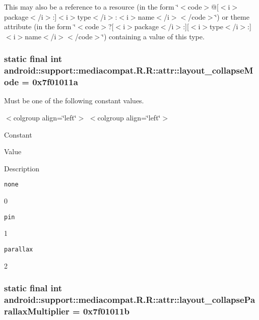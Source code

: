 This may also be a reference to a resource (in the form \char`\"{}$<$code$>$@\mbox{[}$<$i$>$package$<$/i$>$:\mbox{]}$<$i$>$type$<$/i$>$:$<$i$>$name$<$/i$>$$<$/code$>$\char`\"{}) or theme attribute (in the form \char`\"{}$<$code$>$?\mbox{[}$<$i$>$package$<$/i$>$:\mbox{]}\mbox{[}$<$i$>$type$<$/i$>$:\mbox{]}$<$i$>$name$<$/i$>$$<$/code$>$\char`\"{}) containing a value of this type. \hypertarget{classandroid_1_1support_1_1mediacompat_1_1_r_1_1attr_d38602f838c284d0b4e90f9d35408094}{
\subsubsection[{layout\_\-collapseMode}]{\setlength{\rightskip}{0pt plus 5cm}static final int android::support::mediacompat.R.R::attr::layout\_\-collapseMode = 0x7f01011a}}
\label{classandroid_1_1support_1_1mediacompat_1_1_r_1_1attr_d38602f838c284d0b4e90f9d35408094}


Must be one of the following constant values. \begin{TabularC}{0}
\hline
\end{TabularC}
$<$colgroup align=\char`\"{}left\char`\"{}$>$ $<$colgroup align=\char`\"{}left\char`\"{}$>$ 

Constant

Value

Description 

{\tt none}

0

{\tt pin}

1

{\tt parallax}

2\hypertarget{classandroid_1_1support_1_1mediacompat_1_1_r_1_1attr_1a575f4e3e5b8ad2916413f3c403df96}{
\subsubsection[{layout\_\-collapseParallaxMultiplier}]{\setlength{\rightskip}{0pt plus 5cm}static final int android::support::mediacompat.R.R::attr::layout\_\-collapseParallaxMultiplier = 0x7f01011b}}
\label{classandroid_1_1support_1_1mediacompat_1_1_r_1_1attr_1a575f4e3e5b8ad2916413f3c403df96}


